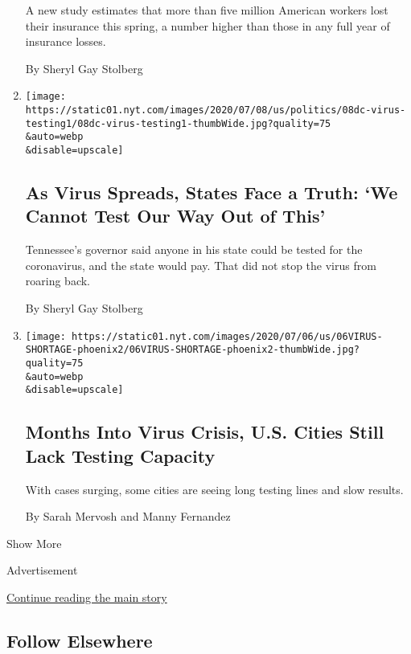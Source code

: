 \begin{enumerate}
  A new study estimates that more than five million American workers
  lost their insurance this spring, a number higher than those in any
  full year of insurance losses.

  By Sheryl Gay Stolberg
\item
  \href{/2020/07/08/us/politics/tennessee-covid-testing.html}{}

  \texttt{[image: https://static01.nyt.com/images/2020/07/08/us/politics/08dc-virus-testing1/08dc-virus-testing1-thumbWide.jpg?quality=75\\\&auto=webp\\\&disable=upscale]}

  \hypertarget{as-virus-spreads-states-face-a-truth-we-cannot-test-our-way-out-of-this}{%
  \subsection{As Virus Spreads, States Face a Truth: `We Cannot Test Our
  Way Out of
  This'}\label{as-virus-spreads-states-face-a-truth-we-cannot-test-our-way-out-of-this}}

  Tennessee's governor said anyone in his state could be tested for the
  coronavirus, and the state would pay. That did not stop the virus from
  roaring back.

  By Sheryl Gay Stolberg
\item
  \href{/2020/07/06/us/coronavirus-test-shortage.html}{}

  \texttt{[image: https://static01.nyt.com/images/2020/07/06/us/06VIRUS-SHORTAGE-phoenix2/06VIRUS-SHORTAGE-phoenix2-thumbWide.jpg?quality=75\\\&auto=webp\\\&disable=upscale]}

  \hypertarget{months-into-virus-crisis-us-cities-still-lack-testing-capacity}{%
  \subsection{Months Into Virus Crisis, U.S. Cities Still Lack Testing
  Capacity}\label{months-into-virus-crisis-us-cities-still-lack-testing-capacity}}

  With cases surging, some cities are seeing long testing lines and slow
  results.

  By Sarah Mervosh and Manny Fernandez
\end{enumerate}

Show More

Advertisement

\protect\hyperlink{after-mid2}{Continue reading the main story}

\hypertarget{follow-elsewhere}{%
\subsection{Follow Elsewhere}\label{follow-elsewhere}}

